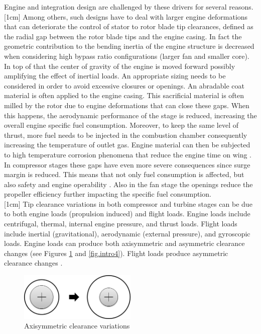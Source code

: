 Engine and integration design are challenged by these drivers for several reasons. [1cm] Among others, such designs have to deal with larger engine deformations that can deteriorate the control of stator to rotor blade  tip clearances, defined as the radial gap between the rotor blade tips and the engine casing. In fact the geometric contribution to the bending inertia of the engine structure is decreased when considering high bypass ratio configurations (larger fan and smaller core). In top of that the center of gravity of the engine is moved forward possibly amplifying the effect of inertial loads. An appropriate sizing needs to be considered in order to avoid excessive closures or openings.
An abradable coat material is often applied to the engine casing. 
 This sacrificial material is often milled by the rotor due to engine deformations that can close these gaps. When this happens, the aerodynamic performance of the stage is reduced, increasing the overall engine specific fuel consumption. Moreover, to keep the same level of thrust, more fuel needs to be injected in the combustion chamber consequently increasing the temperature of outlet gas. Engine material can then be subjected to high temperature corrosion phenomena that reduce the engine time on wing \cite{lattime2002turbine}. In compressor stages these gaps have even more severe consequences since surge margin is reduced. This means that not only fuel consumption is affected, but also safety and engine operability \cite{benito20083d}. Also in the fan stage the openings reduce the propeller efficiency further impacting the specific fuel consumption.\\
[1cm]  
Tip clearance variations in both compressor and turbine stages can be due to both  engine loads (propulsion induced) and flight loads. Engine loads include centrifugal, thermal,
internal engine pressure, and thrust loads. Flight loads
include inertial (gravitational), aerodynamic (external
pressure), and gyroscopic loads. Engine loads can
produce both axisymmetric and asymmetric clearance
changes (see Figures \ref{fig.intro3} and \ref{fig.intro4}). Flight loads produce
asymmetric clearance changes \cite{lattime2002turbine}. 
\begin{figure}[!ht]
\centering   
 \includegraphics[width=0.5\textwidth]{images/intro/axisym_tip}
     \caption{Axisymmetric clearance variations} 
     \label{fig.intro3}
\end{figure}
